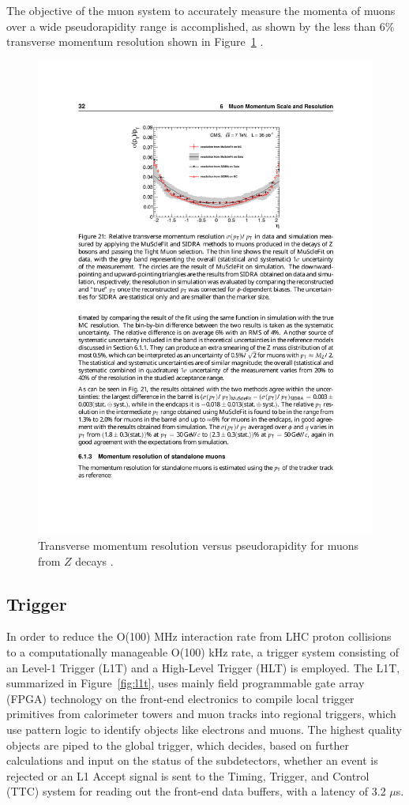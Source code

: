 \indent The objective of the muon system to accurately measure the momenta of muons over a wide pseudorapidity range is accomplished, as shown by the less than 6\% transverse momentum resolution shown in Figure~\ref{fig:muonres} \cite{1748-0221-7-10-P10002}.

\begin{figure}[tbh]
\centering
\includegraphics[width=5in]{figures/muonres.pdf}
\caption{Transverse momentum resolution versus pseudorapidity for muons from $Z$ decays \cite{1748-0221-7-10-P10002}.}
\label{fig:muonres}
\end{figure}

\subsection{Trigger}

In order to reduce the O(100) MHz interaction rate from LHC proton collisions to a computationally manageable O(100) kHz rate, a trigger system consisting of an Level-1 Trigger (L1T) and a High-Level Trigger (HLT) is employed. The L1T, summarized in Figure~\ref{fig:l1t}, uses mainly field programmable gate array (FPGA) technology on the front-end electronics to compile local trigger primitives from calorimeter towers and muon tracks into regional triggers, which use pattern logic to identify objects like electrons and muons. The highest quality objects are piped to the global trigger, which decides, based on further calculations and input on the status of the subdetectors, whether an event is rejected or an L1 Accept signal is sent to the Timing, Trigger, and Control (TTC) system for reading out the front-end data buffers, with a latency of 3.2 $\mu$s.

